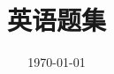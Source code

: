 \documentclass[a4paper]{ctexart}
\title{\heiti\zihao{2} 英语题集}
\date{\today}
\begin{document}
    \maketitle
    \thispagestyle{empty}

    \newpage

    \setcounter{page}{1}
    \cfoot{\thepage}

    \renewcommand{\footrulewidth}{1pt}
    \tableofcontents

    \newpage


    \setcounter{page}{1}


    \begin{sloppy}
        \begin{enumerate}
            
            
        \end{enumerate}
    \end{sloppy}
\end{document}
